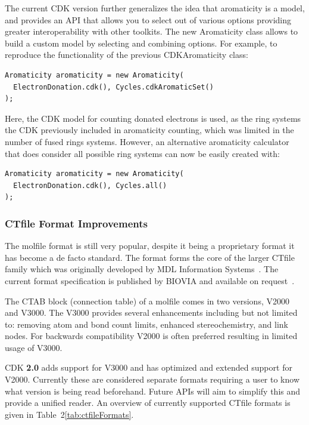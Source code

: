 \documentclass[10pt]{bmcart}
\begin{document}
  The current CDK version further generalizes the idea that aromaticity is a
  model, and provides an API that allows you to select out of various options
  providing greater interoperability with other toolkits. The new
  Aromaticity class allows to build a custom model by selecting and combining
  options. For example, to reproduce the functionality of the previous
  CDKAromaticity class:

\begin{verbatim}
Aromaticity aromaticity = new Aromaticity(
  ElectronDonation.cdk(), Cycles.cdkAromaticSet()
);
\end{verbatim}

Here, the CDK model for counting donated electrons is used, as the ring systems
the CDK previously included in aromaticity counting, which was limited in the 
number of fused rings systems. However, an alternative aromaticity calculator
that does consider all possible ring systems can now be easily created with:

\begin{verbatim}
Aromaticity aromaticity = new Aromaticity(
  ElectronDonation.cdk(), Cycles.all()
);
\end{verbatim}

\subsubsection*{CTfile Format Improvements}

The molfile format is still very popular, despite it being a proprietary
format it has become a de facto standard. The format forms the core of the larger
CTfile family which was originally developed by MDL Information Systems~\cite{Dalby92}. The
current format specification is published by BIOVIA and available on 
request~\cite{ctfilespec}.
 
The CTAB block (connection table) of a molfile comes in two versions, V2000
and V3000. The V3000 provides several enhancements including but not
limited to: removing atom and bond count limits, enhanced stereochemistry,
and link nodes. For backwards compatibility V2000 is often preferred resulting
in limited usage of V3000.

CDK \textbf{2.0} adds support for V3000 and has optimized and extended
support for V2000. Currently these are considered separate formats requiring
a user to know what version is being read beforehand. Future APIs will aim
to simplify this and provide a unified reader. An overview of currently
supported CTfile formats is given in Table~2\ref{tab:ctfileFormats}.
\end{document}
